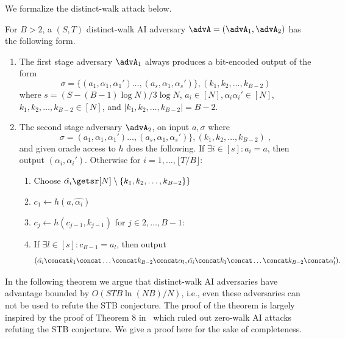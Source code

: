 We formalize the distinct-walk attack below.
\begin{definition} For $B>2$, a $(S,T)$ distinct-walk AI adversary $\advA=(\advA_1,\advA_2)$ has the following form.
\begin{enumerate}
    \item The first stage adversary $\advA_1$ always produces a bit-encoded output of the form \[\sigma=\{(a_1,\alpha_1,\alpha_1')\ldots,(a_s,\alpha_1,\alpha_s')\},(k_1,k_2,\ldots,k_{B-2})\] where $s=(S-(B-1)\log N)/3\log N$, $a_i\in [N],\alpha_i\alpha_i'\in [N]$, $k_1,k_2,\ldots,k_{B-2}\in [N]$, and $|k_1,k_2,\ldots,k_{B-2}|=B-2$.
    \item The second stage adversary $\advA_2$, on input $a,\sigma$ where $$\sigma= (a_1,\alpha_1,\alpha_1')\ldots,(a_s,\alpha_1,\alpha_s')\}, (k_1,k_2,\ldots,k_{B-2})\;,$$ and given oracle access to $h$ does the following.
    If $\exists i\in [s]:a_i=a$, then output $(\alpha_i,\alpha_i')$. Otherwise for $i=1,\ldots,\lfloor T/B\rfloor$:
    \begin{enumerate}
        \item Choose $\hat{\alpha_i}\getsr [N]\setminus \{k_1,k_2,\ldots,k_{B-2}\}\}$
        \item $c_1\gets h(a,\hat{\alpha_i})$
        \item  $c_j\gets h(c_{j-1},k_{j-1})$ for $j\in 2,\ldots, B-1$:
        \item If $\exists l\in [s]: c_{B-1}= a_l$, then output $$(\hat{\alpha_i}\concat k_{1}\concat \ldots\concat k_{B-2}\concat \alpha_{l},\hat{\alpha_i}\concat k_{1}\concat \ldots\concat k_{B-2}\concat \alpha_{l}').$$
    \end{enumerate}
\end{enumerate}
\end{definition}

In the following theorem we argue that distinct-walk AI adversaries have advantage bounded by $O({STB \ln(NB)}/{N})$, i.e., even these adversaries can not be used to refute the STB conjecture.  The proof of the theorem is largely inspired by the proof of Theorem 8 in~\cite{AkshimaCDW20} which ruled out zero-walk AI attacks refuting the STB conjecture. We give a proof here for the sake of completeness.


